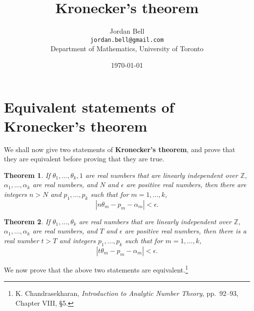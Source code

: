 \documentclass{article}
\newtheorem{theorem}{Theorem}
\theoremstyle{definition}
\begin{document}
\title{Kronecker's theorem}
\author{Jordan Bell\\ \texttt{jordan.bell@gmail.com}\\Department of Mathematics, University of Toronto}
\date{\today}

\maketitle



\section{Equivalent statements of Kronecker's theorem}
We shall now give  two statements of \textbf{Kronecker's theorem}, and prove that they
are equivalent before proving that they are true.

\begin{theorem}
If $\theta_1,\ldots,\theta_k,1$ are real numbers that are linearly
independent over $\mathbb{Z}$,  $\alpha_1,\ldots,\alpha_k$ are real 
numbers, and $N$ and $\epsilon$ are positive real numbers, then there are integers
$n>N$ and $p_1,\ldots,p_k$ such that for $m=1,\ldots,k$,
\[
|n\theta_m - p_m - \alpha_m| < \epsilon.
\]
\label{kronecker1}
\end{theorem}

\begin{theorem}
If $\theta_1,\ldots,\theta_k$ are real numbers that are linearly
independent over $\mathbb{Z}$, $\alpha_1,\ldots,\alpha_k$ are real numbers,
and $T$ and $\epsilon$ are positive real numbers, then there is a  real number $t>T$ 
and integers $p_1,\ldots,p_k$ such that for $m=1,\ldots,k$,
\[
|t\theta_m - p_m - \alpha_m | < \epsilon.
\]
\label{kronecker2}
\end{theorem}

We now prove that the above two statements are equivalent.\footnote{K. Chandrasekharan, {\em Introduction to Analytic Number Theory},
pp.~92--93, Chapter VIII, \S 5.}
\end{document}
